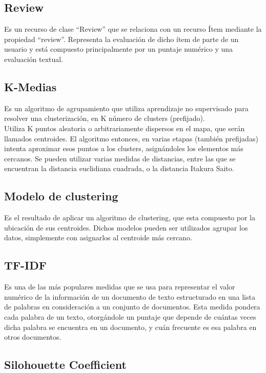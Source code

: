 \subsection{Review}

Es un recurso de clase ``Review'' que se relaciona con un recurso Ítem mediante la propiedad ``review''. Representa la evaluación de dicho ítem 
de parte de un usuario y está compuesto principalmente por un puntaje numérico y una evaluación textual. \\

\subsection{K-Medias}

Es un algoritmo de agrupamiento que utiliza aprendizaje no supervisado para resolver una clusterización, en K número de clusters (prefijado).\\
Utiliza K puntos aleatoria o arbitrariamente dispersos en el mapa, que serán llamados centroides. El algoritmo entonces, en varias etapas (también prefijadas) 
intenta aproximar esos puntos a los clusters, asignándoles los elementos más cercanos.
Se pueden utilizar varias medidas de distancias, entre las que se encuentran la distancia euclidiana cuadrada, o la distancia Itakura Saito.

\subsection{Modelo de clustering}

Es el resultado de aplicar un algoritmo de clustering, que esta compuesto por la ubicación de sus centroides. Dichos modelos pueden ser utilizados 
agrupar los datos, simplemente con asignarlos al centroide más cercano. 

\subsection{TF-IDF}

Es una de las más populares medidas que se usa para representar el valor numérico de la información de un documento de texto estructurado en una lista de palabras en consideración a un conjunto de documentos.
Esta medida pondera cada palabra de un texto, otorgándole un puntaje que depende de cuántas veces dicha palabra se encuentra en un documento, y cuán frecuente 
es esa palabra en otros documentos.

\subsection{Silohouette Coefficient}

